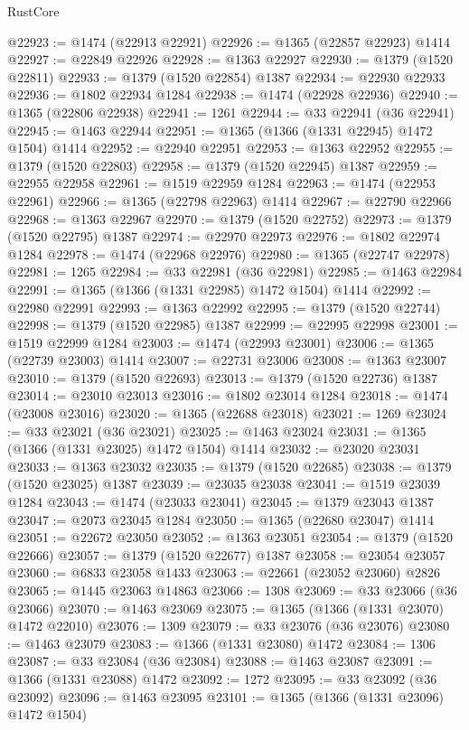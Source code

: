 \begin{lexlean}{RustCore}
\begin{coremodule}
@22923 := @1474 (@22913 @22921)
@22926 := @1365 (@22857 @22923) @1414
@22927 := @22849 @22926
@22928 := @1363 @22927
@22930 := @1379 (@1520 @22811)
@22933 := @1379 (@1520 @22854) @1387
@22934 := @22930 @22933
@22936 := @1802 @22934 @1284
@22938 := @1474 (@22928 @22936)
@22940 := @1365 (@22806 @22938)
@22941 := 1261
@22944 := @33 @22941 (@36 @22941)
@22945 := @1463 @22944
@22951 := @1365 (@1366 (@1331 @22945) @1472 @1504) @1414
@22952 := @22940 @22951
@22953 := @1363 @22952
@22955 := @1379 (@1520 @22803)
@22958 := @1379 (@1520 @22945) @1387
@22959 := @22955 @22958
@22961 := @1519 @22959 @1284
@22963 := @1474 (@22953 @22961)
@22966 := @1365 (@22798 @22963) @1414
@22967 := @22790 @22966
@22968 := @1363 @22967
@22970 := @1379 (@1520 @22752)
@22973 := @1379 (@1520 @22795) @1387
@22974 := @22970 @22973
@22976 := @1802 @22974 @1284
@22978 := @1474 (@22968 @22976)
@22980 := @1365 (@22747 @22978)
@22981 := 1265
@22984 := @33 @22981 (@36 @22981)
@22985 := @1463 @22984
@22991 := @1365 (@1366 (@1331 @22985) @1472 @1504) @1414
@22992 := @22980 @22991
@22993 := @1363 @22992
@22995 := @1379 (@1520 @22744)
@22998 := @1379 (@1520 @22985) @1387
@22999 := @22995 @22998
@23001 := @1519 @22999 @1284
@23003 := @1474 (@22993 @23001)
@23006 := @1365 (@22739 @23003) @1414
@23007 := @22731 @23006
@23008 := @1363 @23007
@23010 := @1379 (@1520 @22693)
@23013 := @1379 (@1520 @22736) @1387
@23014 := @23010 @23013
@23016 := @1802 @23014 @1284
@23018 := @1474 (@23008 @23016)
@23020 := @1365 (@22688 @23018)
@23021 := 1269
@23024 := @33 @23021 (@36 @23021)
@23025 := @1463 @23024
@23031 := @1365 (@1366 (@1331 @23025) @1472 @1504) @1414
@23032 := @23020 @23031
@23033 := @1363 @23032
@23035 := @1379 (@1520 @22685)
@23038 := @1379 (@1520 @23025) @1387
@23039 := @23035 @23038
@23041 := @1519 @23039 @1284
@23043 := @1474 (@23033 @23041)
@23045 := @1379 @23043 @1387
@23047 := @2073 @23045 @1284
@23050 := @1365 (@22680 @23047) @1414
@23051 := @22672 @23050
@23052 := @1363 @23051
@23054 := @1379 (@1520 @22666)
@23057 := @1379 (@1520 @22677) @1387
@23058 := @23054 @23057
@23060 := @6833 @23058 @1433
@23063 := @22661 (@23052 @23060) @2826
@23065 := @1445 @23063 @14863
@23066 := 1308
@23069 := @33 @23066 (@36 @23066)
@23070 := @1463 @23069
@23075 := @1365 (@1366 (@1331 @23070) @1472 @22010)
@23076 := 1309
@23079 := @33 @23076 (@36 @23076)
@23080 := @1463 @23079
@23083 := @1366 (@1331 @23080) @1472
@23084 := 1306
@23087 := @33 @23084 (@36 @23084)
@23088 := @1463 @23087
@23091 := @1366 (@1331 @23088) @1472
@23092 := 1272
@23095 := @33 @23092 (@36 @23092)
@23096 := @1463 @23095
@23101 := @1365 (@1366 (@1331 @23096) @1472 @1504)

\end{coremodule}
\end{lexlean}
